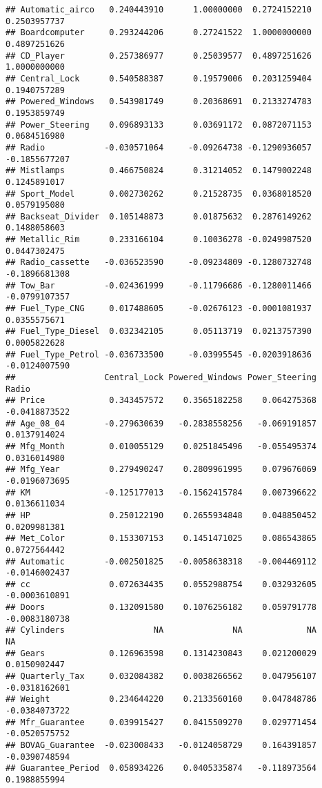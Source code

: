 \documentclass[]{article}
\begin{document}
\begin{verbatim}
## Automatic_airco   0.240443910      1.00000000  0.2724152210  0.2503957737
## Boardcomputer     0.293244206      0.27241522  1.0000000000  0.4897251626
## CD_Player         0.257386977      0.25039577  0.4897251626  1.0000000000
## Central_Lock      0.540588387      0.19579006  0.2031259404  0.1940757289
## Powered_Windows   0.543981749      0.20368691  0.2133274783  0.1953859749
## Power_Steering    0.096893133      0.03691172  0.0872071153  0.0684516980
## Radio            -0.030571064     -0.09264738 -0.1290936057 -0.1855677207
## Mistlamps         0.466750824      0.31214052  0.1479002248  0.1245891017
## Sport_Model       0.002730262      0.21528735  0.0368018520  0.0579195080
## Backseat_Divider  0.105148873      0.01875632  0.2876149262  0.1488058603
## Metallic_Rim      0.233166104      0.10036278 -0.0249987520  0.0447302475
## Radio_cassette   -0.036523590     -0.09234809 -0.1280732748 -0.1896681308
## Tow_Bar          -0.024361999     -0.11796686 -0.1280011466 -0.0799107357
## Fuel_Type_CNG     0.017488605     -0.02676123 -0.0001081937  0.0355575671
## Fuel_Type_Diesel  0.032342105      0.05113719  0.0213757390  0.0005822628
## Fuel_Type_Petrol -0.036733500     -0.03995545 -0.0203918636 -0.0124007590
##                  Central_Lock Powered_Windows Power_Steering         Radio
## Price             0.343457572    0.3565182258    0.064275368 -0.0418873522
## Age_08_04        -0.279630639   -0.2838558256   -0.069191857  0.0137914024
## Mfg_Month         0.010055129    0.0251845496   -0.055495374  0.0316014980
## Mfg_Year          0.279490247    0.2809961995    0.079676069 -0.0196073695
## KM               -0.125177013   -0.1562415784    0.007396622  0.0136611034
## HP                0.250122190    0.2655934848    0.048850452  0.0209981381
## Met_Color         0.153307153    0.1451471025    0.086543865  0.0727564442
## Automatic        -0.002501825   -0.0058638318   -0.004469112 -0.0146002437
## cc                0.072634435    0.0552988754    0.032932605 -0.0003610891
## Doors             0.132091580    0.1076256182    0.059791778 -0.0083180738
## Cylinders                  NA              NA             NA            NA
## Gears             0.126963598    0.1314230843    0.021200029  0.0150902447
## Quarterly_Tax     0.032084382    0.0038266562    0.047956107 -0.0318162601
## Weight            0.234644220    0.2133560160    0.047848786 -0.0384073722
## Mfr_Guarantee     0.039915427    0.0415509270    0.029771454 -0.0520575752
## BOVAG_Guarantee  -0.023008433   -0.0124058729    0.164391857 -0.0390748594
## Guarantee_Period  0.058934226    0.0405335874   -0.118973564  0.1988855994

\end{verbatim}
\end{document}
